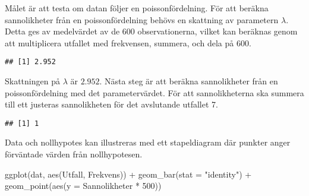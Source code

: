 \documentclass[
]{book}
\newenvironment{Shaded}{\begin{snugshade}}{\end{snugshade}}
\newcommand{\AttributeTok}[1]{\textcolor[rgb]{0.77,0.63,0.00}{#1}}
\newcommand{\DecValTok}[1]{\textcolor[rgb]{0.00,0.00,0.81}{#1}}
\newcommand{\FunctionTok}[1]{\textcolor[rgb]{0.00,0.00,0.00}{#1}}
\newcommand{\NormalTok}[1]{#1}
\newcommand{\OtherTok}[1]{\textcolor[rgb]{0.56,0.35,0.01}{#1}}
\newcommand{\SpecialCharTok}[1]{\textcolor[rgb]{0.00,0.00,0.00}{#1}}
\newcommand{\StringTok}[1]{\textcolor[rgb]{0.31,0.60,0.02}{#1}}
\theoremstyle{definition}
\theoremstyle{definition}
\theoremstyle{definition}
\theoremstyle{definition}
\theoremstyle{remark}
\begin{document}
Målet är att testa om datan följer en poissonfördelning. För att beräkna sannolikheter från en poissonfördelning behövs en skattning av parametern \(\lambda\). Detta ges av medelvärdet av de 600 observationerna, vilket kan beräknas genom att multiplicera utfallet med frekvensen, summera, och dela på 600.

\begin{Shaded}
\end{Shaded}

\begin{verbatim}
## [1] 2.952
\end{verbatim}

Skattningen på \(\lambda\) är \(2.952\). Nästa steg är att beräkna sannolikheter från en poissonfördelning med det parametervärdet. För att sannolikheterna ska summera till ett justeras sannolikheten för det avslutande utfallet 7.

\begin{Shaded}
\end{Shaded}

\begin{verbatim}
## [1] 1
\end{verbatim}

Data och nollhypotes kan illustreras med ett stapeldiagram där punkter anger förväntade värden från nollhypotesen.

\begin{Shaded}
\begin{Highlighting}[]
\FunctionTok{ggplot}\NormalTok{(dat, }\FunctionTok{aes}\NormalTok{(Utfall, Frekvens)) }\SpecialCharTok{+}
  \FunctionTok{geom\_bar}\NormalTok{(}\AttributeTok{stat =} \StringTok{"identity"}\NormalTok{) }\SpecialCharTok{+}
  \FunctionTok{geom\_point}\NormalTok{(}\FunctionTok{aes}\NormalTok{(}\AttributeTok{y =}\NormalTok{ Sannolikheter }\SpecialCharTok{*} \DecValTok{500}\NormalTok{))}
\end{Highlighting}
\end{Shaded}
\end{document}
